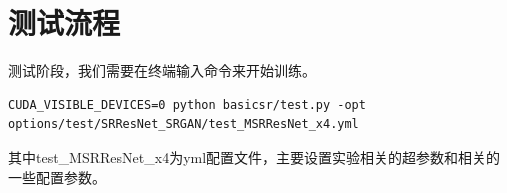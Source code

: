 \documentclass[../main.tex]{subfiles}
\begin{document}
\begin{enumerate}





\end{enumerate}


\section{测试流程}

测试阶段，我们需要在终端输入命令来开始训练。
\begin{verbatim}
CUDA_VISIBLE_DEVICES=0 python basicsr/test.py -opt options/test/SRResNet_SRGAN/test_MSRResNet_x4.yml
\end{verbatim}

其中test\_MSRResNet\_x4为yml配置文件，主要设置实验相关的超参数和相关的一些配置参数。
\end{document}
